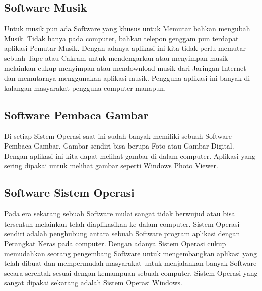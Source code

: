 \subsection{Software Musik}
\begin{flushleft}
Untuk musik pun ada Software yang khusus untuk Memutar bahkan mengubah Musik. Tidak hanya pada computer, bahkan telepon genggam pun terdapat aplikasi Pemutar Musik. Dengan adanya aplikasi ini kita tidak perlu memutar sebuah Tape atau Cakram untuk mendengarkan atau menyimpan musik melainkan cukup menyimpan atau mendownload musik dari Jaringan Internet dan memutarnya menggunakan aplikasi musik. Pengguna aplikasi ini banyak di kalangan masyarakat pengguna computer manapun.
\end{flushleft}
\subsection{Software Pembaca Gambar}
\begin{flushleft}
Di setiap Sistem Operasi saat ini sudah banyak memiliki sebuah Software Pembaca Gambar. Gambar sendiri bisa berupa Foto atau Gambar Digital. Dengan aplikasi ini kita dapat melihat gambar di dalam computer. Aplikasi yang sering dipakai untuk melihat gambar seperti Windows Photo Viewer.
\end{flushleft}
\subsection{Software Sistem Operasi}
\begin{flushleft}
Pada era sekarang sebuah Software mulai sangat tidak berwujud atau bisa tersentuh melainkan telah diaplikasikan ke dalam computer. Sistem Operasi sendiri adalah penghubung antara sebuah Software program aplikasi dengan Perangkat Keras pada computer. Dengan adanya Sistem Operasi cukup memudahkan seorang pengembang Software untuk mengembangkan aplikasi yang telah dibuat dan mempermudah masyarakat untuk menjalankan banyak Software secara serentak sesuai dengan kemampuan sebuah computer. Sistem Operasi yang sangat dipakai sekarang adalah Sistem Operasi Windows.
\end{flushleft}
